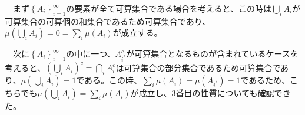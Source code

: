 \documentclass{article}
\begin{document}
　まず$\left\{ A_i \right\}_{i = 1}^{\infty}$の要素が全て可算集合である場合を考えると、この時は$\bigcup_i A_i$が可算集合の可算個の和集合であるため可算集合であり、$\mu \left( \bigcup_i A_i \right) = 0 = \sum_i \mu \left( A_i \right)$が成立する。

　次に$\left\{ A_i \right\}_{i = 1}^{\infty}$の中に一つ、$A_{i^*}^c$が可算集合となるものが含まれているケースを考えると、$\left( \bigcup_i A_i \right)^c = \bigcap_i A_i^c$は可算集合の部分集合であるため可算集合であり、$\mu \left(  \bigcup_i A_i  \right) = 1$である。この時、$\sum_i \mu \left( A_i \right) = \mu \left( A_{i^*} \right) = 1$であるため、こちらでも$\mu \left(  \bigcup_i A_i  \right) = \sum_i \mu \left( A_i \right)$が成立し、3番目の性質についても確認できた。
\end{document}
